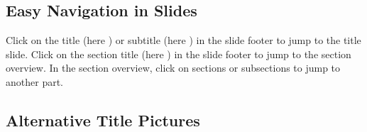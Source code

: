 \documentclass[
	aspectratio=169, %
	8pt, %
]{beamer}
\begin{document}
{\subsection{Easy Navigation in Slides}
\begin{frame}{\insertsubsection}
	\vfill
	Click on the title (here \textbf{\insertshorttitle}) or subtitle (here \textbf{\insertshortsubtitle}) in the slide footer to jump to the title slide.
	\vfill
	Click on the section title (here \textbf{\insertsection}) in the slide footer to jump to the section overview.
	\vfill
	In the section overview, click on sections or subsections to jump to another part.
	\vfill
\end{frame}

\subsection{Alternative Title Pictures}
\maketitle[] %
\maketitle[oct20-o25b][100] %
\maketitle[may21-q47][200] %
}
\end{document}
